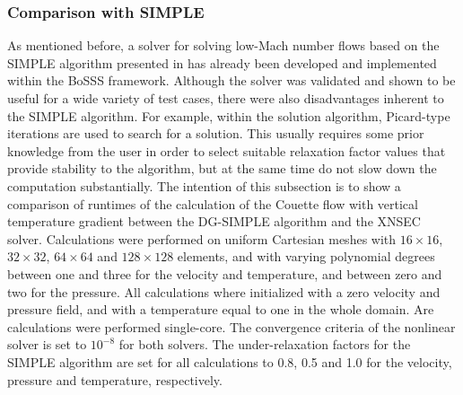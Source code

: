 \subsubsection{Comparison with SIMPLE}
As mentioned before, a solver for solving low-Mach number flows based on the SIMPLE algorithm presented in \textcite{kleinHighorderDiscontinuousGalerkin2016} has already been developed and implemented within the BoSSS framework.
Although the solver was validated and shown to be useful for a wide variety of test cases, there were also disadvantages inherent to the SIMPLE algorithm. For example,
within the solution algorithm, Picard-type iterations are used to search for a solution. This usually requires some prior knowledge from the user in order to select suitable relaxation factor values that provide stability to the algorithm, but at the same time do not slow down the computation substantially. 
The intention of this subsection is to show a comparison of runtimes of the calculation of the Couette flow with vertical temperature gradient between the DG-SIMPLE algorithm \parencite{kleinHighorderDiscontinuousGalerkin2016} and the XNSEC solver. Calculations were performed on uniform Cartesian meshes with $16\times16$, $32\times32$, $64\times64$ and $128\times128$ elements, and with varying polynomial degrees between one and three for the velocity and temperature, and between zero and two for the pressure. All calculations where initialized with a zero velocity and pressure field, and with a temperature equal to one in the whole domain. Are calculations were performed single-core. The convergence criteria of the nonlinear solver is set to $10^{-8}$ for both solvers. The under-relaxation factors for the SIMPLE algorithm are set for all calculations to 0.8, 0.5 and 1.0 for the velocity, pressure and temperature, respectively.

